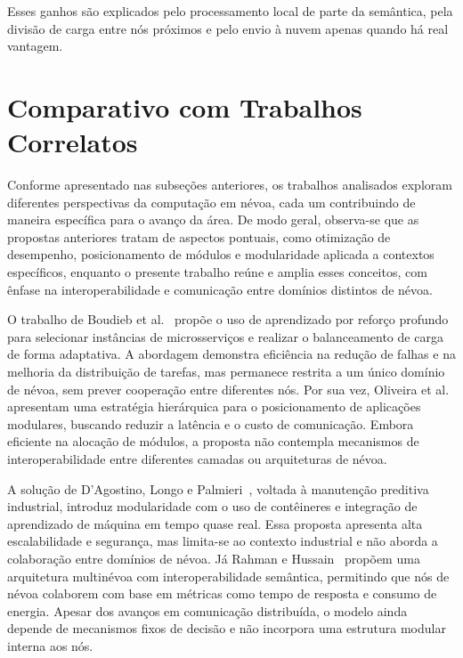 Esses ganhos são explicados pelo processamento local de parte da semântica, pela divisão de carga entre nós próximos e pelo envio à nuvem apenas quando há real vantagem.

\section{Comparativo com Trabalhos Correlatos}

Conforme apresentado nas subseções anteriores, os trabalhos analisados exploram diferentes perspectivas da computação em névoa, cada um contribuindo de maneira específica para o avanço da área. De modo geral, observa-se que as propostas anteriores tratam de aspectos pontuais, como otimização de desempenho, posicionamento de módulos e modularidade aplicada a contextos específicos, enquanto o presente trabalho reúne e amplia esses conceitos, com ênfase na interoperabilidade e comunicação entre domínios distintos de névoa.

O trabalho de Boudieb et al.~\cite{boudieb2024} propõe o uso de aprendizado por reforço profundo para selecionar instâncias de microsserviços e realizar o balanceamento de carga de forma adaptativa. A abordagem demonstra eficiência na redução de falhas e na melhoria da distribuição de tarefas, mas permanece restrita a um único domínio de névoa, sem prever cooperação entre diferentes nós.
Por sua vez, Oliveira et al.~\cite{oliveira2024} apresentam uma estratégia hierárquica para o posicionamento de aplicações modulares, buscando reduzir a latência e o custo de comunicação. Embora eficiente na alocação de módulos, a proposta não contempla mecanismos de interoperabilidade entre diferentes camadas ou arquiteturas de névoa.

A solução de D’Agostino, Longo e Palmieri~\cite{dagostino2025}, voltada à manutenção preditiva industrial, introduz modularidade com o uso de contêineres e integração de aprendizado de máquina em tempo quase real. Essa proposta apresenta alta escalabilidade e segurança, mas limita-se ao contexto industrial e não aborda a colaboração entre domínios de névoa.
Já Rahman e Hussain~\cite{rahman2024} propõem uma arquitetura multinévoa com interoperabilidade semântica, permitindo que nós de névoa colaborem com base em métricas como tempo de resposta e consumo de energia. Apesar dos avanços em comunicação distribuída, o modelo ainda depende de mecanismos fixos de decisão e não incorpora uma estrutura modular interna aos nós.

